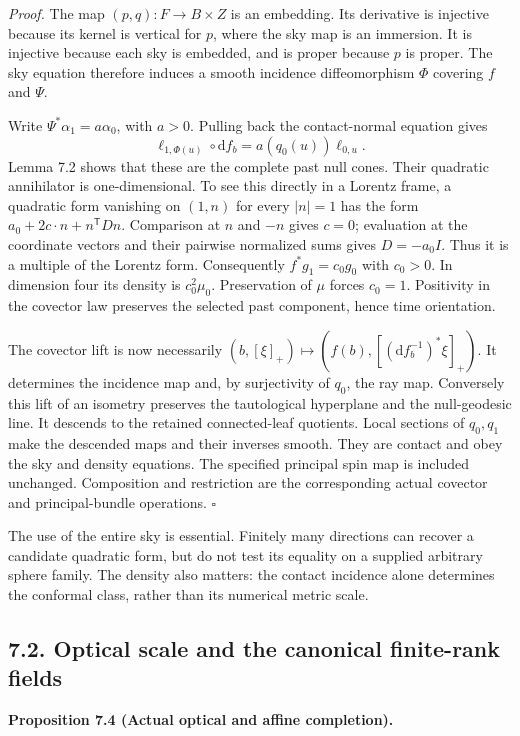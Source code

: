 \documentclass[
  english,
  11pt,
  reqno]{amsart}
\makeatletter
\newcommand{\paperdisplaynext}{%
  \let\paper@savedstartsection\@startsection
  \def\@startsection##1##2##3##4##5##6{%
    \let\@startsection\paper@savedstartsection
    \@tempskipa ##5\relax
    \ifdim\@tempskipa<\z@
      \def\paper@afterskip{.35\baselineskip}%
    \else
      \def\paper@afterskip{##5}%
    \fi
    \@startsection{##1}{##2}{##3}{##4}{\paper@afterskip}{##6}}}
\newcommand{\paperdisplaysection}{\paperdisplaynext\subsection}
\newcommand{\pandocstatementheading}[1]{%
  \par\if@nobreak\else
    \addpenalty{\@beginparpenalty}%
    \addvspace{.5\baselineskip plus .2\baselineskip minus .2\baselineskip}%
  \fi
  {\normalfont\bfseries #1\par}%
  \nobreak\@afterindenttrue\@afterheading
}
\let\paper@displaysection\paperdisplaysection
\renewcommand{\paperdisplaysection}[1]{%
  \let\paper@savedhangfrom\@hangfrom
  \long\def\@hangfrom##1##2{%
    \paper@savedhangfrom{##1}{\paper@headingparagraph##2}}%
  \paper@displaysection{#1}%
  \let\@hangfrom\paper@savedhangfrom}
\makeatother
\begin{document}
\emph{Proof.} The map \((p,q):F\to B\times Z\) is an embedding. Its
derivative is injective because its kernel is vertical for \(p\), where
the sky map is an immersion. It is injective because each sky is
embedded, and is proper because \(p\) is proper. The sky equation
therefore induces a smooth incidence diffeomorphism \(\Phi\) covering
\(f\) and \(\Psi\).

Write \(\Psi^*\alpha_1=a\alpha_0\), with \(a>0\). Pulling back the
contact-normal equation gives%
 \[
\ell_{1,\Phi(u)}\circ\mathrm df_b
=a(q_0(u))\ell_{0,u}.
\] Lemma 7.2 shows that these are the complete past null cones. Their
quadratic annihilator is one-dimensional. To see this directly in a
Lorentz frame, a quadratic form vanishing on \((1,n)\) for every
\(|n|=1\) has the form \(a_0+2c\cdot n+n^{\mathsf T}Dn\). Comparison at
\(n\) and \(-n\) gives \(c=0\); evaluation at the coordinate vectors and
their pairwise normalized sums gives \(D=-a_0I\). Thus it is a multiple
of the Lorentz form. Consequently \(f^*g_1=c_0g_0\) with \(c_0>0\). In
dimension four its density is \(c_0^2\mu_0\). Preservation of \(\mu\)
forces \(c_0=1\). Positivity in the covector law preserves the selected
past component, hence time orientation.

The covector lift is now necessarily
\((b,[\xi]_+)\mapsto(f(b),[(\mathrm df_b^{-1})^*\xi]_+)\). It determines
the incidence map and, by surjectivity of \(q_0\), the ray map.
Conversely this lift of an isometry preserves the tautological
hyperplane and the null-geodesic line. It descends to the retained
connected-leaf quotients. Local sections of \(q_0,q_1\) make the
descended maps and their inverses smooth. They are contact and obey the
sky and density equations. The specified principal spin map is included
unchanged. Composition and restriction are the corresponding actual
covector and principal-bundle operations. \hfill\(\square\)

The use of the entire sky is essential. Finitely many directions can
recover a candidate quadratic form, but do not test its equality on a
supplied arbitrary sphere family. The density also matters: the contact
incidence alone determines the conformal class, rather than its
numerical metric scale.

\paperdisplaysection{7.2. Optical scale and the canonical finite-rank
fields}\label{optical-scale-and-the-canonical-finite-rank-fields}\label{sec:online-optical-and-finite-rank-fields}

\pandocstatementheading{\leavevmode{}\label{prop:online-canonical-optical-completion}Proposition 7.4 (Actual optical and affine completion).}
\end{document}
